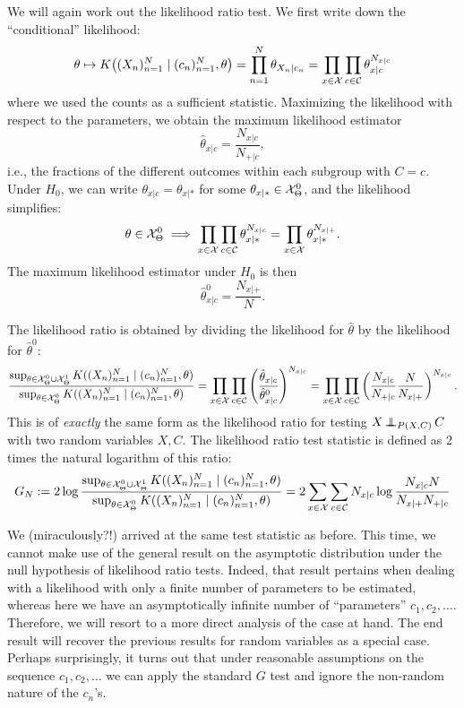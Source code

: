 We will again work out the likelihood ratio test.
We first write down the ``conditional'' likelihood:
$$\theta \mapsto K\big((X_n)_{n=1}^N \mid (c_n)_{n=1}^N, \theta\big)
= \prod_{n=1}^N \theta_{X_n|c_n} 
= \prod_{x\in\mathcal{X}} \prod_{c\in\mathcal{C}} \theta_{x|c}^{N_{x|c}}$$
where we used the counts as a sufficient statistic.
Maximizing the likelihood with respect to the parameters, we obtain the maximum likelihood estimator
$$\hat \theta_{x|c} = \frac{N_{x|c}}{N_{+|c}},$$
i.e., the fractions of the different outcomes within each subgroup with $C = c$.
Under $H_0$, we can write $\theta_{x|c} = \theta_{x|\ast}$ for some $\theta_{x|\ast} \in \mathcal{X}_\Theta^0$, 
and the likelihood simplifies:
$$\theta \in \mathcal{X}_\Theta^0 \implies \prod_{x\in\mathcal{X}} \prod_{c\in\mathcal{C}} \theta_{x|\ast}^{N_{x|c}} = 
\prod_{x\in\mathcal{X}} \theta_{x|\ast}^{N_{x|+}}.$$
The maximum likelihood estimator under $H_0$ is then
$$\hat \theta^0_{x|c} = \frac{N_{x|+}}{N}.$$

The likelihood ratio is obtained by dividing the likelihood for $\hat \theta$ by the likelihood for $\hat \theta^0$:
\begin{equation}\label{eq:ext_G_test_statistic}
  \frac{\sup_{\theta\in\mathcal{X}_\Theta^0 \cup \mathcal{X}_\Theta^1} K((X_n)_{n=1}^N \mid (c_n)_{n=1}^N, \theta)}{\sup_{\theta\in\mathcal{X}_\Theta^0} K((X_n)_{n=1}^N \mid (c_n)_{n=1}^N, \theta)}
= \prod_{x\in\mathcal{X}} \prod_{c\in\mathcal{C}} \left(\frac{\hat \theta_{x|c}}{\hat \theta^0_{x|c}}\right)^{N_{x|c}} 
= \prod_{x\in\mathcal{X}} \prod_{c\in\mathcal{C}} \left(\frac{N_{x|c}}{N_{+|c}} \frac{N}{N_{x|+}}\right)^{N_{x|c}}.
\end{equation}
This is of \emph{exactly} the same form as the likelihood ratio  for testing
$X \operatorname*{\perp\mkern-11mu\perp}_{P(X,C)} C$ with two random variables $X,C$.
The likelihood ratio test statistic is defined as 2 times the natural logarithm of this ratio:
$$G_N := 2 \log \frac{\sup_{\theta\in\mathcal{X}_\Theta^0 \cup \mathcal{X}_\Theta^1} K((X_n)_{n=1}^N \mid (c_n)_{n=1}^N, \theta)}{\sup_{\theta\in\mathcal{X}_\Theta^0} K((X_n)_{n=1}^N \mid (c_n)_{n=1}^N, \theta)} = 2 \sum_{x\in\mathcal{X}} \sum_{c\in\mathcal{C}} N_{x|c} \log \frac{N_{x|c} N}{N_{x|+} N_{+|c}}$$

We (miraculously?!) arrived at the same test statistic as before.
This time, we cannot make use of the general result on the asymptotic distribution under the null hypothesis of 
likelihood ratio tests. Indeed, that result pertains when dealing
with a likelihood with only a finite number of parameters to be estimated, whereas here we have an asymptotically infinite number
of ``parameters'' $c_1,c_2,\dots$. Therefore, we will resort to a more direct analysis of the case at hand. The end result will
recover the previous results for random variables as a special case. Perhaps surprisingly, it turns out that under reasonable 
assumptions on the sequence $c_1,c_2,\dots$ we can apply the standard $G$ test and ignore the non-random nature of the $c_n$'s.

